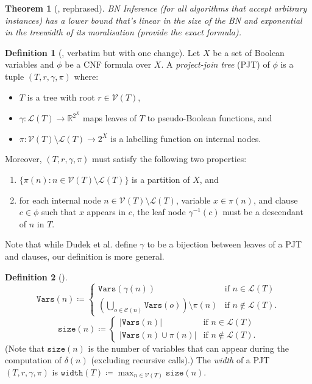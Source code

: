 \documentclass{article}
\newtheorem{theorem}{Theorem}
\theoremstyle{definition}
\newtheorem{definition}{Definition}
\theoremstyle{remark}
\begin{document}
\begin{theorem}[\cite{DBLP:conf/ecai/KwisthoutBG10}, rephrased]
  BN Inference (for all algorithms that accept arbitrary instances) has a lower
  bound that's linear in the size of the BN and exponential in the treewidth of
  its moralisation (provide the exact formula).
\end{theorem}

\begin{definition}[\cite{DBLP:conf/cp/DudekPV20}, verbatim but with one change]
  Let $X$ be a set of Boolean variables and $\phi$ be a CNF formula over $X$. A
  \emph{project-join tree} (PJT) of $\phi$ is a tuple $(T, r, \gamma, \pi)$
  where:
  \begin{itemize}
  \item $T$ is a tree with root $r \in \mathcal{V}(T)$,
  \item $\gamma\colon \mathcal{L}(T) \to \mathbb{R}^{2^X}$ maps leaves of $T$ to
    pseudo-Boolean functions, and
  \item $\pi\colon \mathcal{V}(T) \setminus \mathcal{L}(T) \to 2^X$ is a
    labelling function on internal nodes.
  \end{itemize}
  Moreover, $(T, r, \gamma, \pi)$ must satisfy the following two properties:
  \begin{enumerate}
  \item $\{\pi(n) : n \in \mathcal{V}(T) \setminus \mathcal{L}(T)\}$ is a
    partition of $X$, and
  \item for each internal node $n \in \mathcal{V}(T) \setminus \mathcal{L}(T)$,
    variable $x \in \pi(n)$, and clause $c \in \phi$ such that $x$ appears in
    $c$, the leaf node $\gamma^{-1}(c)$ must be a descendant of $n$ in $T$.
  \end{enumerate}
\end{definition}

Note that while Dudek et al. \cite{DBLP:conf/cp/DudekPV20} define $\gamma$ to be
a bijection between leaves of a PJT and clauses, our definition is more
general.

\begin{definition}[\cite{DBLP:conf/cp/DudekPV20}]
  \[
    \mathtt{Vars}(n) \coloneqq
    \begin{cases}
      \mathtt{Vars}(\gamma(n)) & \text{if } n \in \mathcal{L}(T) \\
      \left( \bigcup_{o \in \mathcal{C}(n)} \mathtt{Vars}(o) \right) \setminus
      \pi(n) & \text{if } n \not\in \mathcal{L}(T).
    \end{cases}
  \]
  \[
    \mathtt{size}(n) \coloneqq
    \begin{cases}
      |\mathtt{Vars}(n)| & \text{if } n \in \mathcal{L}(T) \\
      |\mathtt{Vars}(n) \cup \pi(n)| & \text{if } n \not\in \mathcal{L}(T).
    \end{cases}
  \]
  (Note that $\mathtt{size}(n)$ is the number of variables that can appear
  during the computation of $\delta(n)$ (excluding recursive calls).)
  The \emph{width} of a PJT $(T, r, \gamma, \pi)$ is
  $\mathtt{width}(T) \coloneqq \max_{n \in \mathcal{V}(T)} \mathtt{size}(n)$.
\end{definition}
\end{document}
